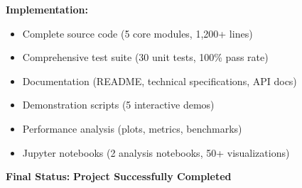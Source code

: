 \documentclass[12pt,a4paper]{article}
\begin{document}
\textbf{Implementation:}
\begin{itemize}
    \item Complete source code (5 core modules, 1,200+ lines)
    \item Comprehensive test suite (30 unit tests, 100\% pass rate)
    \item Documentation (README, technical specifications, API docs)
    \item Demonstration scripts (5 interactive demos)
    \item Performance analysis (plots, metrics, benchmarks)
    \item Jupyter notebooks (2 analysis notebooks, 50+ visualizations)
\end{itemize}

\textbf{Final Status:} \checkmark \textbf{Project Successfully Completed}
\end{document}
